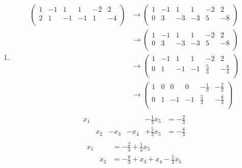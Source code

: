 \documentclass{article}
\begin{document}
\begin{enumerate}[(i)]
\begin{enumerate}
  \item
    \begin{align*}
      \left(
      \begin{array}{ccccc|c}
        1 & -1 & 1  & 1  & -2 & 2 \\
        2 &  1 & -1 & -1 & 1  & -4 \\
      \end{array}
      \right)
      &\rightarrow
      \left(
      \begin{array}{ccccc|c}
        1 & -1 & 1  & 1  & -2 & 2 \\
        0 &  3 & -3 & -3 & 5  & -8 \\
      \end{array}
      \right) \\
      &\rightarrow
      \left(
      \begin{array}{ccccc|c}
        1 & -1 & 1  & 1  & -2 & 2 \\
        0 &  3 & -3 & -3 & 5  & -8 \\
      \end{array}
      \right) \\
      &\rightarrow
      \left(
      \begin{array}{ccccc|c}
        1 & -1 & 1  & 1  & -2          & 2            \\
        0 &  1 & -1 & -1 & \frac{5}{3} & -\frac{8}{3} \\
      \end{array}
      \right) \\
      &\rightarrow
      \left(
      \begin{array}{ccccc|c}
        1 & 0 & 0  & 0  & -\frac{1}{3}& -\frac{2}{3}  \\
        0 & 1 & -1 & -1 & \frac{5}{3} & -\frac{8}{3} \\
      \end{array}
      \right) \\
    \end{align*}
    \[
      \begin{array}{llllll}
        x_1 &     &      &      &- \frac{1}{3}x_5 &= - \frac{2}{3} \\
            & x_2 &- x_3 &- x_4 &+ \frac{5}{3}x_5 &= - \frac{8}{3}  \\
      \end{array}
    \]
    \[
      \begin{array}{lll}
        x_1 &     &= - \frac{2}{3} + \frac{1}{3} x_5 \\
            & x_2 &= - \frac{8}{3} + x_3 + x_4 - \frac{5}{3}x_5 \\
      \end{array}
    \]


\end{enumerate}
\end{enumerate}
\end{document}
